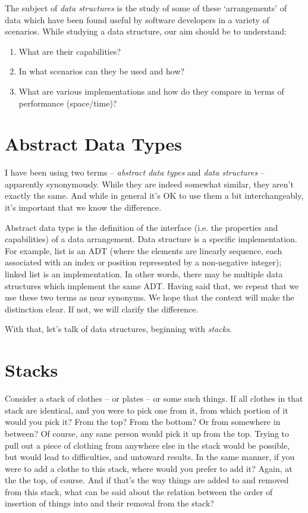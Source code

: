 \documentclass[12pt,a4paper]{article}
\begin{document}
The subject of \emph{data structures} is the study of some of these `arrangements' of data which have been found useful by software developers in a variety of scenarios. While studying a data structure, our aim should be to understand:
\begin{enumerate}
\item What are their capabilities?
\item In what scenarios can they be used and how?
\item What are various implementations and how do they compare in terms of performance (space/time)?
\end{enumerate}

\section{Abstract Data Types}
I have been using two terms -- \emph{abstract data types} and \emph{data structures} -- apparently synonymously. While they are indeed somewhat similar, they aren't exactly the same. And while in general it's OK to use them a bit interchangeably, it's important that we know the difference.

Abstract data type is the definition of the interface (i.e. the properties and capabilities) of a data arrangement. Data structure is a specific implementation. For example, list is an ADT (where the elements are linearly sequence, each associated with an index or position represented by a non-negative integer); linked list is an implementation. In other words, there may be multiple data structures which implement the same ADT. Having said that, we repeat that we use these two terms as near synonyms. We hope that the context will make the distinction clear. If not, we will clarify the difference.

With that, let's talk of data structures, beginning with \emph{stacks}.

\section{Stacks}
Consider a stack of clothes -- or plates -- or some such things. If all clothes in that stack are identical, and you were to pick one from it, from which portion of it would you pick it? From the top? From the bottom? Or from somewhere in between? Of course, any sane person would pick it up from the top. Trying to pull out a piece of clothing from anywhere else in the stack would be possible, but would lead to difficulties, and untoward results. In the same manner, if you were to add a clothe to this stack, where would you prefer to add it? Again, at the the top, of course. And if that's the way things are added to and removed from this stack, what can be said about the relation between the order of insertion of things into and their removal from the stack?
\end{document}
